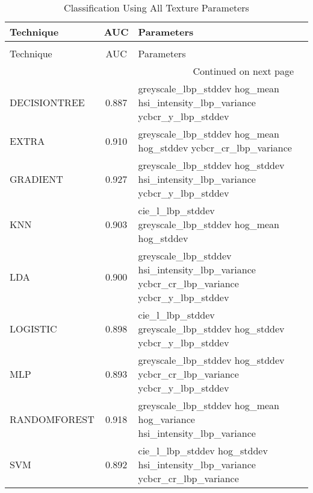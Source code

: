 \begin{longtable}{lcll}
\caption[Classification Using All Texture Parameters]{Classification Using All Texture Parameters}
\label{table:texture}\\
\toprule
   Technique &   AUC &                                                                               Parameters \\
\midrule
\endfirsthead
\caption[]{Classification Using All Texture Parameters} \\
\toprule
   Technique &   AUC &                                                                               Parameters \\
\midrule
\endhead
\midrule
\multicolumn{3}{r}{{Continued on next page}} \\
\midrule
\endfoot

\bottomrule
\endlastfoot
DECISIONTREE & 0.887 &              greyscale\_lbp\_stddev hog\_mean hsi\_intensity\_lbp\_variance ycbcr\_y\_lbp\_stddev \\
       EXTRA & 0.910 &                           greyscale\_lbp\_stddev hog\_mean hog\_stddev ycbcr\_cr\_lbp\_variance \\
    GRADIENT & 0.927 &            greyscale\_lbp\_stddev hog\_stddev hsi\_intensity\_lbp\_variance ycbcr\_y\_lbp\_stddev \\
         KNN & 0.903 &                                cie\_l\_lbp\_stddev greyscale\_lbp\_stddev hog\_mean hog\_stddev \\
         LDA & 0.900 & greyscale\_lbp\_stddev hsi\_intensity\_lbp\_variance ycbcr\_cr\_lbp\_variance ycbcr\_y\_lbp\_stddev \\
    LOGISTIC & 0.898 &                      cie\_l\_lbp\_stddev greyscale\_lbp\_stddev hog\_stddev ycbcr\_y\_lbp\_stddev \\
         MLP & 0.893 &                 greyscale\_lbp\_stddev hog\_stddev ycbcr\_cr\_lbp\_variance ycbcr\_y\_lbp\_stddev \\
RANDOMFOREST & 0.918 &                    greyscale\_lbp\_stddev hog\_mean hog\_variance hsi\_intensity\_lbp\_variance \\
         SVM & 0.892 &             cie\_l\_lbp\_stddev hog\_stddev hsi\_intensity\_lbp\_variance ycbcr\_cr\_lbp\_variance \\
\end{longtable}
